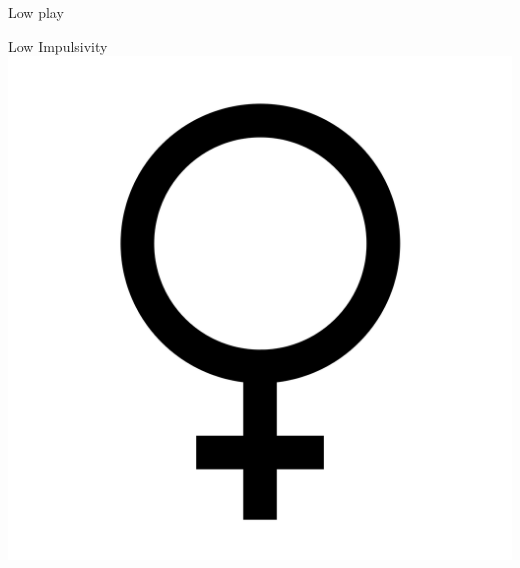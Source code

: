 \documentclass[aspectratio=169]{beamer}
\begin{document}
\begin{frame}
  \begin{center}
    \Huge Low play
    \\ \small \cite{langford93}
  \end{center}
\end{frame}

\begin{frame}
  \begin{center}
    \Huge Low Impulsivity \\
    \includegraphics[scale=.025]{./assets/women.png} \\
    \small \cite{langford93}
  \end{center}
\end{frame}
\end{document}
